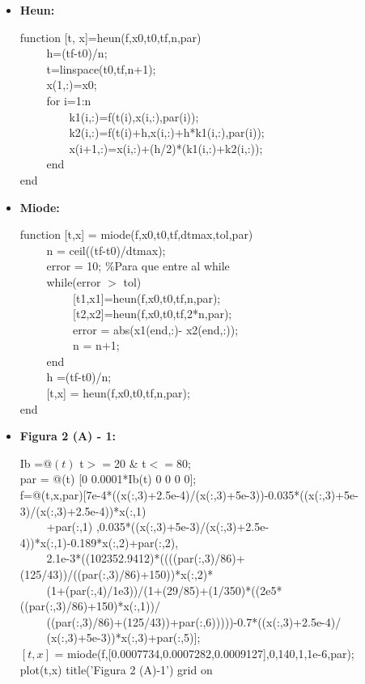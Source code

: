 \documentclass[a4paper]{article}
\begin{document}
\begin{itemize}
	\item \textbf{Heun:}
	\begin{tabbing}
function [t, x]=heun(f,x0,t0,tf,n,par)\\
	~~~~ h=(tf-t0)/n;\\
	~~~~ t=linspace(t0,tf,n+1);\\
	~~~~ x(1,:)=x0;\\
	~~~~ for i=1:n\\
	~~~~~~~~ k1(i,:)=f(t(i),x(i,:),par(i));\\
	~~~~~~~~ k2(i,:)=f(t(i)+h,x(i,:)+h*k1(i,:),par(i));\\
	~~~~~~~~ x(i+1,:)=x(i,:)+(h/2)*(k1(i,:)+k2(i,:));\\
	~~~~ end\\
	end\\
	\end{tabbing}
	
	\item \textbf{Miode:}
	\begin{tabbing}
function [t,x] = miode(f,x0,t0,tf,dtmax,tol,par)\\
	~~~~ n = ceil((tf-t0)/dtmax);\\
	~~~~ error = 10; \%Para que entre al while\\
	~~~~ while(error $>$ tol)\\
	~~~~ ~~~~ 	[t1,x1]=heun(f,x0,t0,tf,n,par);\\
	~~~~ ~~~~ 	[t2,x2]=heun(f,x0,t0,tf,2*n,par);\\
	~~~~ ~~~~ 	error = abs(x1(end,:)- x2(end,:));\\
	~~~~ ~~~~ 	n = n+1;\\
	~~~~ end\\
	~~~~ h =(tf-t0)/n;\\
	~~~~ [t,x] = heun(f,x0,t0,tf,n,par);\\
end
	\end{tabbing}
	
	\item \textbf{Figura 2 (A) - 1:}
	\begin{tabbing}
		Ib =@$(t)$ t$>=$20 \& t$<=$80;\\
		par = @(t) [0 0.0001*Ib(t) 0 0 0 0];\\
		f=@(t,x,par)[7e-4*((x(:,3)+2.5e-4)/(x(:,3)+5e-3))-0.035*((x(:,3)+5e-3)/(x(:,3)+2.5e-4))*x(:,1)\\
		~~~~ +par(:,1) ,0.035*((x(:,3)+5e-3)/(x(:,3)+2.5e-4))*x(:,1)-0.189*x(:,2)+par(:,2),\\
		~~~~ 2.1e-3*((102352.9412)*((((par(:,3)/86)+(125/43))/((par(:,3)/86)+150))*x(:,2)*\\
		~~~~ (1+(par(:,4)/1e3))/(1+(29/85)+(1/350)*((2e5*((par(:,3)/86)+150)*x(:,1))/\\
		~~~~ ((par(:,3)/86)+(125/43))+par(:,6)))))-0.7*((x(:,3)+2.5e-4)/\\
		~~~~ (x(:,3)+5e-3))*x(:,3)+par(:,5)];\\
		$[t,x]$ = miode(f,[0.0007734,0.0007282,0.0009127],0,140,1,1e-6,par);\\
		plot(t,x)
		title('Figura 2 (A)-1')
		grid on
	\end{tabbing}


\end{itemize}
\end{document}
